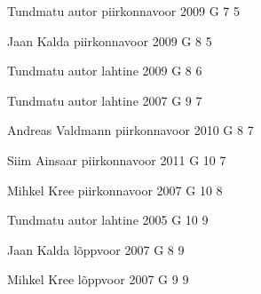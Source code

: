 \documentclass[11pt]{article}
\begin{document}
{Tundmatu autor} %
{piirkonnavoor} %
{2009} %
{G 7} %
{5} %
{

\ifEngHint
\fi
}

{Jaan Kalda} %
{piirkonnavoor} %
{2009} %
{G 8} %
{5} %
{

\ifEngHint
\fi
}

{Tundmatu autor} %
{lahtine} %
{2009} %
{G 8} %
{6} %
{

\ifEngHint
\fi
}

{Tundmatu autor} %
{lahtine} %
{2007} %
{G 9} %
{7} %
{

\ifEngHint
\fi
}

{Andreas Valdmann} %
{piirkonnavoor} %
{2010} %
{G 8} %
{7} %
{

\ifEngHint
\fi
}

{Siim Ainsaar} %
{piirkonnavoor} %
{2011} %
{G 10} %
{7} %
{

\ifEngHint
\fi
}

{Mihkel Kree} %
{piirkonnavoor} %
{2007} %
{G 10} %
{8} %
{

\ifEngHint
\fi
}

{Tundmatu autor} %
{lahtine} %
{2005} %
{G 10} %
{9} %
{

\ifEngHint
\fi
}

{Jaan Kalda} %
{lõppvoor} %
{2007} %
{G 8} %
{9} %
{

\ifEngHint
\fi
}

{Mihkel Kree} %
{lõppvoor} %
{2007} %
{G 9} %
{9} %
{

\ifEngHint
\fi
}
\end{document}
